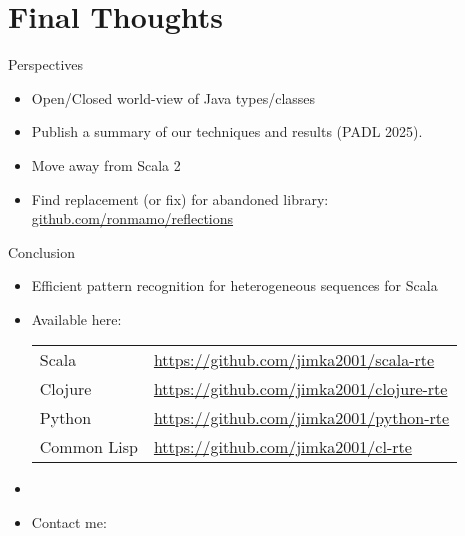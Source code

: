 \section{Final Thoughts}


\begin{frame}{Perspectives}
  \begin{itemize}
  \item Open/Closed world-view of Java types/classes
  \item Publish a summary of our techniques and results (PADL 2025).
  \item Move away from Scala 2
  \item Find replacement (or fix) for abandoned library:   \url{github.com/ronmamo/reflections}
  \end{itemize}
\end{frame}

{
\begin{frame}{Conclusion}
  \begin{itemize}
  \item Efficient pattern recognition for heterogeneous sequences for Scala
  \item Available here:

    \bigskip
    
    \begin{tabular}{ll}
    Scala & \url{https://github.com/jimka2001/scala-rte}\\
    Clojure & \url{https://github.com/jimka2001/clojure-rte}\\
    Python & \url{https://github.com/jimka2001/python-rte}\\
    Common Lisp & \url{https://github.com/jimka2001/cl-rte}    
  \end{tabular}


    \bigskip
    
  \item {}

    \bigskip

  \item Contact me: 

  \end{itemize}
\end{frame}

}
